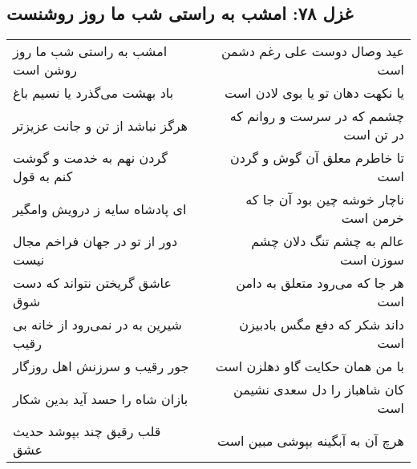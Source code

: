 \begin{center}
\section*{غزل ۷۸: امشب به راستی شب ما روز روشنست}
\label{sec:078}
\begin{longtable}{l p{0.5cm} r}
امشب به راستی شب ما روز روشن است
&&
عید وصال دوست علی رغم دشمن است
\\
باد بهشت می‌گذرد یا نسیم باغ
&&
یا نکهت دهان تو یا بوی لادن است
\\
هرگز نباشد از تن و جانت عزیزتر
&&
چشمم که در سرست و روانم که در تن است
\\
گردن نهم به خدمت و گوشت کنم به قول
&&
تا خاطرم معلق آن گوش و گردن است
\\
ای پادشاه سایه ز درویش وامگیر
&&
ناچار خوشه چین بود آن جا که خرمن است
\\
دور از تو در جهان فراخم مجال نیست
&&
عالم به چشم تنگ دلان چشم سوزن است
\\
عاشق گریختن نتواند که دست شوق
&&
هر جا که می‌رود متعلق به دامن است
\\
شیرین به در نمی‌رود از خانه بی رقیب
&&
داند شکر که دفع مگس بادبیزن است
\\
جور رقیب و سرزنش اهل روزگار
&&
با من همان حکایت گاو دهلزن است
\\
بازان شاه را حسد آید بدین شکار
&&
کان شاهباز را دل سعدی نشیمن است
\\
قلب رقیق چند بپوشد حدیث عشق
&&
هرچ آن به آبگینه بپوشی مبین است
\\
\end{longtable}
\end{center}
